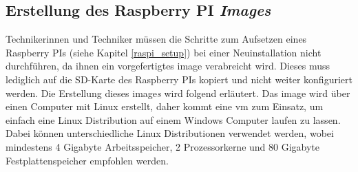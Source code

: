 \subsection{Erstellung des Raspberry PI \textit{Images}}
Technikerinnen und Techniker müssen die Schritte zum Aufsetzen eines Raspberry PIs (siehe Kapitel \ref{raspi_setup}) bei einer Neuinstallation nicht durchführen, da ihnen ein vorgefertigtes \gls{image} verabreicht wird. Dieses muss lediglich auf die SD-Karte des Raspberry PIs kopiert und nicht weiter konfiguriert werden. Die Erstellung dieses \gls{image}\textit{s} wird folgend erläutert. Das \gls{image} wird über einen Computer mit Linux erstellt, daher kommt eine \ac{vm} zum Einsatz, um einfach eine Linux Distribution auf einem Windows Computer laufen zu lassen. Dabei können unterschiedliche Linux Distributionen verwendet werden, wobei mindestens 4 Gigabyte Arbeitsspeicher, 2 Prozessorkerne und 80 Gigabyte Festplattenspeicher empfohlen werden. 

